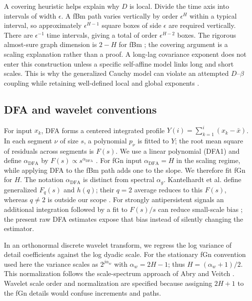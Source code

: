 \documentclass[12pt,twocolumn]{article}
\begin{document}
A covering heuristic helps explain why $D$ is local. Divide the time axis into intervals of width $\epsilon$. A fBm path varies vertically by order $\epsilon^H$ within a typical interval, so approximately $\epsilon^{H-1}$ square boxes of side $\epsilon$ are required vertically. There are $\epsilon^{-1}$ time intervals, giving a total of order $\epsilon^{H-2}$ boxes. The rigorous almost-sure graph dimension is $2-H$ for fBm \cite{harte2001}; the covering argument is a scaling explanation rather than a proof. A long-lag covariance exponent does not enter this construction unless a specific self-affine model links long and short scales. This is why the generalized Cauchy model can violate an attempted $D$--$\beta$ coupling while retaining well-defined local and global exponents \cite{gneiting2004}.

\subsection{DFA and wavelet conventions}

For input $x_k$, DFA forms a centered integrated profile $Y(i)=\sum_{k=1}^{i}(x_k-\bar x)$. In each segment $\nu$ of size $s$, a polynomial $p_{\nu}$ is fitted to $Y$; the root mean square of residuals across segments is $F(s)$. We use a linear polynomial (DFA1) and define $\alpha_{\mathrm{DFA}}$ by $F(s)\propto s^{\alpha_{\mathrm{DFA}}}$ \cite{peng1994,kantelhardt2002}. For fGn input $\alpha_{\mathrm{DFA}}=H$ in the scaling regime, while applying DFA to the fBm path adds one to the slope. We therefore fit fGn for $H$. The notation $\alpha_{\mathrm{DFA}}$ is distinct from spectral $\alpha_g$. Kantelhardt et al. define generalized $F_q(s)$ and $h(q)$; their $q=2$ average reduces to this $F(s)$, whereas $q\ne2$ is outside our scope \cite{kantelhardt2002}. For strongly antipersistent signals an additional integration followed by a fit to $F(s)/s$ can reduce small-scale bias \cite{chen2002}; the present raw DFA estimates expose that bias instead of silently changing the estimator.

In an orthonormal discrete wavelet transform, we regress the log variance of detail coefficients against the log dyadic scale. For the stationary fGn convention used here the variance scales as $2^{j\alpha_w}$ with $\alpha_w=2H-1$; thus $H=(\alpha_w+1)/2$. This normalization follows the scale-spectrum approach of Abry and Veitch \cite{abry1998}. Wavelet scale order and normalization are specified because assigning $2H+1$ to the fGn details would confuse increments and paths.
\end{document}
